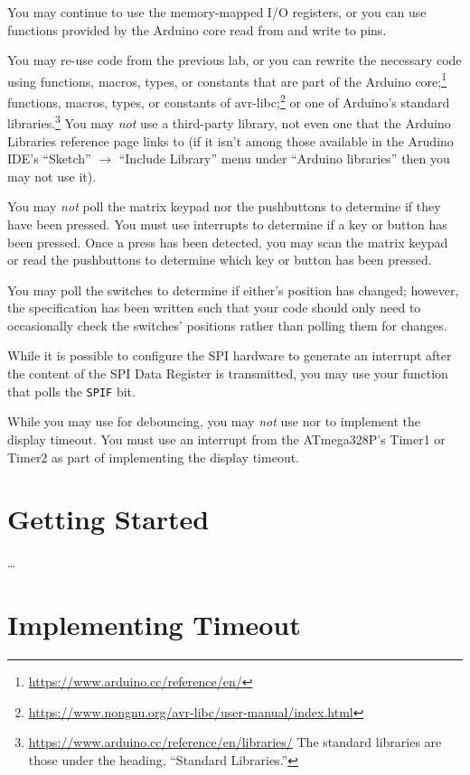 You may continue to use the memory-mapped I/O registers, or you can use
functions provided by the Arduino core read from and write to pins.

You may re-use code from the previous lab, or you can rewrite the necessary
code using functions, macros, types, or constants that are part of the Arduino
core;\footnote{\url{https://www.arduino.cc/reference/en/}} functions, macros,
types, or constants of
avr-libc;\footnote{\url{https://www.nongnu.org/avr-libc/user-manual/index.html}}
or one of Arduino's standard
libraries.\footnote{\url{https://www.arduino.cc/reference/en/libraries/} The
standard libraries are those under the heading, ``Standard Libraries.''} You
may \textit{not} use a third-party library, not even one that the Arduino
Libraries reference page links to (if it isn't among those available in the
Arudino IDE's ``Sketch'' $\rightarrow$ ``Include Library'' menu under
``Arduino libraries'' then you may not use it).

You may \textit{not} poll the matrix keypad nor the pushbuttons to determine
if they have been pressed. You must use interrupts to determine if a key or
button has been pressed. Once a press has been detected, you may scan the
matrix keypad or read the pushbuttons to determine which key or button has
been pressed.

You may poll the switches to determine if either's position has changed;
however, the specification has been written such that your code should only
need to occasionally check the switches' positions rather than polling them for
changes.

While it is possible to configure the SPI hardware to generate an interrupt
after the content of the SPI Data Register is transmitted, you may use your
 function that polls the \texttt{SPIF} bit.

While you may use  for debouncing, you may \textit{not} use
 nor  to implement the display timeout.
You must use an interrupt from the ATmega328P's Timer1 or Timer2 as part of
implementing the display timeout.

\section{Getting Started} \label{sec:GettingStarted}

\dots

\section{Implementing Timeout}\label{sec:TimerInterrupts}

